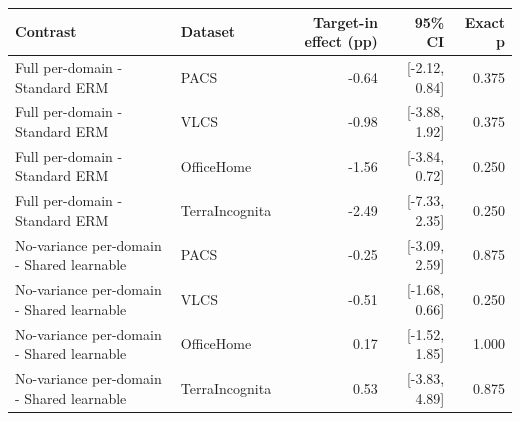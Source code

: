 \begin{tabular}{llrrr}
\toprule
Contrast & Dataset & Target-in effect (pp) & 95\% CI & Exact p \\
\midrule
Full per-domain - Standard ERM & PACS & -0.64 & [-2.12, 0.84] & 0.375 \\
Full per-domain - Standard ERM & VLCS & -0.98 & [-3.88, 1.92] & 0.375 \\
Full per-domain - Standard ERM & OfficeHome & -1.56 & [-3.84, 0.72] & 0.250 \\
Full per-domain - Standard ERM & TerraIncognita & -2.49 & [-7.33, 2.35] & 0.250 \\
No-variance per-domain - Shared learnable & PACS & -0.25 & [-3.09, 2.59] & 0.875 \\
No-variance per-domain - Shared learnable & VLCS & -0.51 & [-1.68, 0.66] & 0.250 \\
No-variance per-domain - Shared learnable & OfficeHome & 0.17 & [-1.52, 1.85] & 1.000 \\
No-variance per-domain - Shared learnable & TerraIncognita & 0.53 & [-3.83, 4.89] & 0.875 \\
\bottomrule
\end{tabular}
